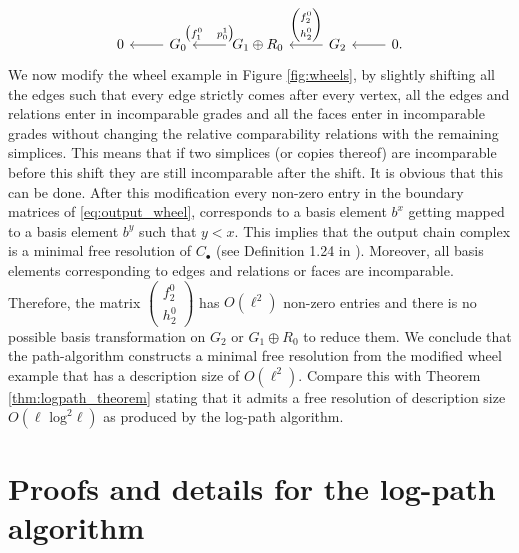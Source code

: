\begin{equation} \label{eq:output_wheel}
\begin{tikzcd}[ampersand replacement=\&]
0 \& G_0  \arrow[l]
  \& G_1\oplus R_0 \arrow{l}[swap]{\begin{pmatrix}f_1^0 & p_0^1 \end{pmatrix}} 
  \& G_2 \arrow{l}[swap]{\begin{pmatrix}f_2^0 \\ h^0_2 \end{pmatrix}} 
  \& 0 \arrow[l] .
\end{tikzcd}
\end{equation}
We now modify the wheel example in Figure \ref{fig:wheels}, by slightly shifting all the edges such that every edge strictly comes after every vertex, all the edges and relations enter in incomparable grades and all the faces enter in incomparable grades without changing the relative comparability relations with the remaining simplices. This means that if two simplices (or copies thereof) are incomparable before this shift they are still incomparable after the shift. It is obvious that this can be done. After this modification every non-zero entry in the boundary matrices of \eqref{eq:output_wheel}, corresponds to a basis element $b^x$ getting mapped to a basis element $b^y$ such that $y<x$. This implies that the output chain complex is a minimal free resolution of $C_\bullet$ (see Definition 1.24 in \cite{miller_sturmfels_book}). Moreover, all basis elements corresponding to edges and relations or faces are incomparable. Therefore, the matrix $\begin{pmatrix}f_2^0 \\ h^0_2 \end{pmatrix}$ has $O(\ell^2)$ non-zero entries and there is no possible basis transformation on $G_2$ or $G_1\oplus R_0$ to reduce them. We conclude that the path-algorithm constructs a minimal free resolution from the modified wheel example that has a description size of $O(\ell^2)$. Compare this with Theorem \ref{thm:logpath_theorem} stating that it admits a free resolution of description size $O(\ell\text{ log}^2\ell)$ as produced by the log-path algorithm.  
%
\section{Proofs and details for the log-path algorithm} \label{app:logpath}
%
